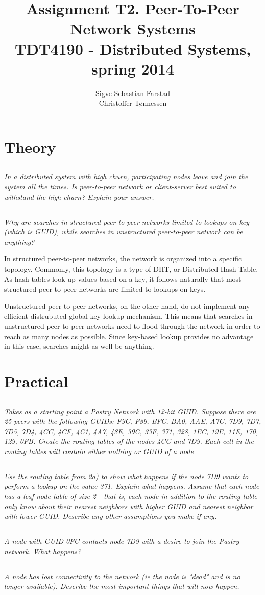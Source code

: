 \documentclass{article}
\title{Assignment T2. Peer-To-Peer Network Systems \\
\large TDT4190 - Distributed Systems, spring 2014}
\author{
    Sigve Sebastian Farstad \\
    Christoffer Tønnessen
}
\newcommand{\question}[1]{\subsection{}\textit{#1}\bigskip}
\begin{document}
\maketitle

\section{Theory}

\question{In a distributed system with high churn, participating nodes leave and join the system all the times. Is peer-to-peer network or client-server best suited to withstand the high churn? Explain your answer.}

\question{Why are searches in structured peer-to-peer networks limited to lookups on key (which is GUID), while searches in unstructured peer-to-peer network can be anything?}

In structured peer-to-peer networks, the network is organized into a specific topology.
Commonly, this topology is a type of DHT, or Distributed Hash Table.
As hash tables look up values based on a key, it follows naturally that most structured peer-to-peer networks are limited to lookups on keys.

Unstructured peer-to-peer networks, on the other hand, do not implement any efficient distrubuted global key lookup mechanism.
This means that searches in unstructured peer-to-peer networks need to flood through the network in order to reach as many nodes as possible.
Since key-based lookup provides no advantage in this case, searches might as well be anything.

 \section{Practical}

 \question{Takes as a starting point a Pastry Network with 12-bit GUID. Suppose there are 25 peers with the following GUIDs: F9C, F89, BFC, BA0, AAE, A7C, 7D9, 7D7, 7D5, 7D4, 4CC, 4CF, 4C1, 4A7, 48E, 39C, 33F, 371, 328, 1EC, 19E, 11E, 170, 129, 0FB. Create the routing tables of the nodes 4CC and 7D9. Each cell in the routing tables will contain either nothing or GUID of a node}

 \question{Use the routing table from 2a) to show what happens if the node 7D9 wants to perform a lookup on the value 371. Explain what happens. Assume that each node has a leaf node table of size 2 - that is, each node in addition to the routing table only know about their nearest neighbors with higher GUID and nearest neighbor with lower GUID. Describe any other assumptions you make if any.}

 \question{A node with GUID 0FC contacts node 7D9 with a desire to join the Pastry network. What happens?}

 \question{A node has lost connectivity to the network (ie the node is "dead" and is no longer available). Describe the most important things that will now happen.}

 
\end{document}
